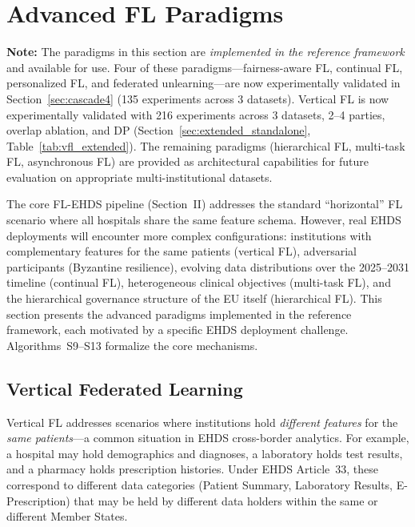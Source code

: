 \documentclass[conference]{IEEEtran}
\begin{document}
\section{Advanced FL Paradigms}
\label{app:paradigms}
\label{sec:advanced}

\textbf{Note:} The paradigms in this section are \textit{implemented in the reference framework} and available for use. Four of these paradigms---fairness-aware FL, continual FL, personalized FL, and federated unlearning---are now experimentally validated in Section~\ref{sec:cascade4} (135 experiments across 3 datasets). Vertical FL is now experimentally validated with 216 experiments across 3 datasets, 2--4 parties, overlap ablation, and DP (Section~\ref{sec:extended_standalone}, Table~\ref{tab:vfl_extended}). The remaining paradigms (hierarchical FL, multi-task FL, asynchronous FL) are provided as architectural capabilities for future evaluation on appropriate multi-institutional datasets.

The core FL-EHDS pipeline (Section~II) addresses the standard ``horizontal'' FL scenario where all hospitals share the same feature schema. However, real EHDS deployments will encounter more complex configurations: institutions with complementary features for the same patients (vertical FL), adversarial participants (Byzantine resilience), evolving data distributions over the 2025--2031 timeline (continual FL), heterogeneous clinical objectives (multi-task FL), and the hierarchical governance structure of the EU itself (hierarchical FL). This section presents the advanced paradigms implemented in the reference framework, each motivated by a specific EHDS deployment challenge. Algorithms~S9--S13 formalize the core mechanisms.

\subsection{Vertical Federated Learning}

Vertical FL addresses scenarios where institutions hold \textit{different features} for the \textit{same patients}---a common situation in EHDS cross-border analytics. For example, a hospital may hold demographics and diagnoses, a laboratory holds test results, and a pharmacy holds prescription histories. Under EHDS Article~33, these correspond to different data categories (Patient Summary, Laboratory Results, E-Prescription) that may be held by different data holders within the same or different Member States.
\end{document}
